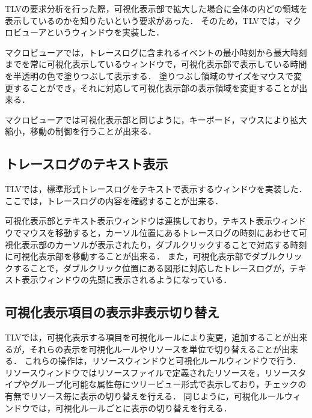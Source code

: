 TLVの要求分析を行った際，可視化表示部で拡大した場合に全体の内どの領域を表示しているのかを知りたいという要求があった．
そのため，TLVでは，マクロビューアというウィンドウを実装した．

マクロビューアでは，トレースログに含まれるイベントの最小時刻から最大時刻までを常に可視化表示しているウィンドウで，可視化表示部で表示している時間を半透明の色で塗りつぶして表示する．
塗りつぶし領域のサイズをマウスで変更することができ，それに対応して可視化表示部の表示領域を変更することが出来る．

マクロビューアでは可視化表示部と同じように，キーボード，マウスにより拡大縮小，移動の制御を行うことが出来る．

\subsection{トレースログのテキスト表示}

TLVでは，標準形式トレースログをテキストで表示するウィンドウを実装した．
ここでは，トレースログの内容を確認することが出来る．

可視化表示部とテキスト表示ウィンドウは連携しており，テキスト表示ウィンドウでマウスを移動すると，カーソル位置にあるトレースログの時刻にあわせて可視化表示部のカーソルが表示されたり，ダブルクリックすることで対応する時刻に可視化表示部を移動することが出来る．
また，可視化表示部でダブルクリックすることで，ダブルクリック位置にある図形に対応したトレースログが，テキスト表示ウィンドウの先頭に表示されるようになっている．

\subsection{可視化表示項目の表示非表示切り替え}

TLVでは，可視化表示する項目を可視化ルールにより変更，追加することが出来るが，それらの表示を可視化ルールやリソースを単位で切り替えることが出来る．
これらの操作は，リソースウィンドウと可視化ルールウィンドウで行う．
リソースウィンドウではリソースファイルで定義されたリソースを，リソースタイプやグループ化可能な属性毎にツリービュー形式で表示しており，チェックの有無でリソース毎に表示の切り替えを行える．
同じように，可視化ルールウィンドウでは，可視化ルールごとに表示の切り替えを行える．
